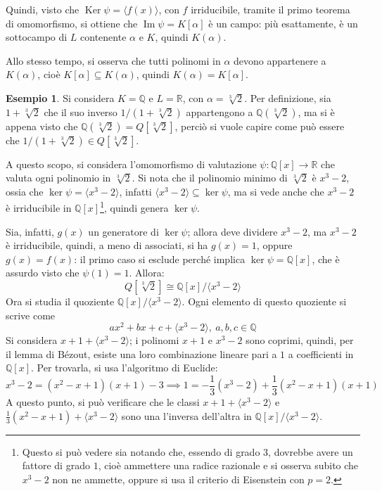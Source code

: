 \documentclass[11pt, a4paper]{scrartcl}
\theoremstyle{definition}
\newtheorem{esempio}{Esempio}
\numberwithin{esempio}{section}
\theoremstyle{definition}
\numberwithin{obs}{section}
\numberwithin{nota}{section}
\numberwithin{equation}{subsection}
\begin{document}
Quindi, visto che $\operatorname{Ker} \psi  = \langle f(x) \rangle$, con $f$ irriducibile, tramite il primo teorema di omomorfismo, si ottiene che $\operatorname{Im} \psi  = K[\alpha ]$ \`e un campo: pi\`u esattamente, \`e un sottocampo di $L$ contenente $\alpha $ e $K$, quindi $K(\alpha )$.

Allo stesso tempo, si osserva che tutti polinomi in $\alpha $ devono appartenere a $K(\alpha )$, cio\`e $K[\alpha ] \subseteq K(\alpha )$, quindi $K(\alpha ) = K[\alpha ]$.
\begin{esempio}
	Si considera $K = \mathbb{Q}$ e $L = \mathbb{R}$, con $\alpha  = \sqrt[3]{2} $.
	Per definizione, sia $1 + \sqrt[3]{2} $ che il suo inverso $1 / (1 + \sqrt[3]{2}) $ appartengono a $\mathbb{Q}(\sqrt[3]{2}) $, ma si \`e appena visto che $\mathbb{Q}(\sqrt[3]{2}) = Q [\sqrt[3]{2} ] $, perci\`o si vuole capire come pu\`o essere che $1 / (1 + \sqrt[3]{2}) \in Q [\sqrt[3]{2} ] $.

	A questo scopo, si considera l'omomorfismo di valutazione $\psi : \mathbb{Q}[x] \to \mathbb{R}$ che valuta ogni polinomio in $\sqrt[3]{2} $.
	Si nota che il polinomio minimo di $\sqrt[3]{2} $ \`e $x^3 - 2$, ossia che $\operatorname{ker} \psi  = \langle x^3 - 2 \rangle$, infatti $ \langle x^3 - 2 \rangle\subseteq \operatorname{ker} \psi $, ma si vede anche che $x^3 - 2$ \`e irriducibile in $\mathbb{Q}[x]$\footnote{Questo si pu\`o vedere sia notando che, essendo di grado $3$, dovrebbe avere un fattore di grado $1$, cio\`e ammettere una radice razionale e si osserva subito che $x^3 - 2$ non ne ammette, oppure si usa il criterio di Eisenstein con $p=2$.}, quindi genera $\operatorname{ker} \psi $.

	Sia, infatti, $g(x)$ un generatore di $\operatorname{ker} \psi $; allora deve dividere $x^3 - 2$, ma $x^3 -2$ \`e irriducibile, quindi, a meno di associati, si ha $g(x) = 1$, oppure $g(x) = f(x)$: il primo caso si esclude perch\'e implica $\operatorname{ker} \psi  = \mathbb{Q}[x]$, che \`e assurdo visto che $\psi (1) = 1$.
	Allora:
	\[
		Q[\sqrt[3]{2}] \cong \mathbb{Q}[x] / \langle x^3 - 2 \rangle
	\] 
	Ora si studia il quoziente $\mathbb{Q}[x] / \langle x^3 - 2 \rangle$.
	Ogni elemento di questo quoziente si scrive come
	\[
	ax^2 + bx + c + \langle x^3 - 2 \rangle, \ a,b,c \in \mathbb{Q}
	\] 
	Si considera $x + 1 + \langle x^3 - 2 \rangle$; i polinomi $x+1 $ e $x^3 - 2$ sono coprimi, quindi, per il lemma di B\'ezout, esiste una loro combinazione lineare pari a $1$ a coefficienti in $\mathbb{Q}[x]$.
	Per trovarla, si usa l'algoritmo di Euclide:
	\[
	x^3 - 2 = (x^2 - x + 1)(x+1) - 3\implies 1 = -\frac{1}{3} (x^3 - 2) + \frac{1}{3} (x^2 - x  +1 ) (x+1)
	\] 
	A questo punto, si pu\`o verificare che le classi $x+1 + \langle x^3 - 2 \rangle$ e $\frac{1}{3}(x^2 - x +1) + \langle x^3 -2 \rangle$ sono una l'inversa dell'altra in $\mathbb{Q}[x] / \langle x^3 - 2 \rangle$.


\end{esempio}
\end{document}
